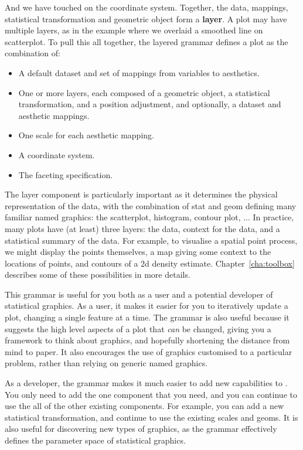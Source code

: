 \noindent And we have touched on the coordinate system.  Together, the data, mappings, statistical transformation and geometric object form a {\bf layer}.  A plot may have multiple layers, as in the example where we overlaid a  smoothed line on scatterplot.  To pull this all together, the layered grammar defines a plot as the combination of:

\begin{itemize}
  \item A default dataset and set of mappings from variables to aesthetics.
  \item One or more layers, each composed of a geometric object, a statistical transformation, and a position adjustment, and optionally, a dataset and aesthetic mappings.
  \item One scale for each aesthetic mapping.
  \item A coordinate system.
  \item The faceting specification.
\end{itemize}

The layer component is particularly important as it determines the physical representation of the data, with the combination of stat and geom defining many familiar named graphics: the scatterplot, histogram, contour plot, ...  In practice, many plots have (at least) three layers: the data, context for the data, and a statistical summary of the data.  For example, to visualise a  spatial point process, we might display the points themselves, a map giving some context to the locations of points, and contours of a 2d density estimate.  Chapter~\ref{cha:toolbox} describes some of these possibilities in more details.

This grammar is useful for you both as a user and a potential developer of statistical graphics.  As a user, it makes it easier for you to iteratively update a plot, changing a single feature at a time.  The grammar is also useful because it suggests the high level aspects of a plot that \emph{can} be changed, giving you a framework to think about graphics, and hopefully shortening the distance from mind to paper.  It also encourages the use of graphics customised to a particular problem, rather than relying on generic named graphics.

As a developer, the grammar makes it much easier to add new capabilities to \ggplot. You only need to add the one component that you need, and you can continue to use the all of the other existing components.  For example, you can add a new statistical transformation, and continue to use the existing scales and geoms.  It is also useful for discovering new types of graphics, as the grammar effectively defines the parameter space of statistical graphics.

